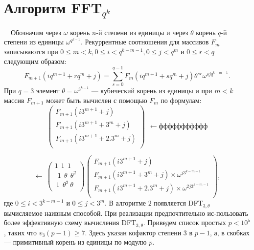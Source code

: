 \documentclass{mai_book}
\begin{document}
\section{Алгоритм  F{\footnotesize FT}$_{q^k}$}
\indent~~Обозначим через $\omega$ корень $n$-й степени из единицы и через $\theta$ корень\linebreak
$q$-й степени из единицы $\omega^{q^{k-1}}$. Рекуррентные соотношения для массивов\linebreak
$F_m$ записываются при $0\leq m<k,0\leq i< q^{k-m-1},0\leq j<q^m$ и $0\leq r<q$ \linebreak
следующим образом:
$$ 
F_{m+1}(iq^{m+1}+rq^m+j)=\sum^{q-1}_{s=0}F_m(iq^{m+1}+sq^m+j)\theta^{sr}\omega^{sjq^{k-m-1}}.
$$
\noindent При $q=3$ элемент $\theta=\omega^{3^{k-1}}$ --- кубический корень из единицы и при\linebreak
$m<k$ массив $F_{m+1}$ может быть вычислен с помощью $F_m$ по формулам:\linebreak
$$
\left(\begin{array}{c}
  F_{m+1}(i3^{m+1}+j)\\
  F_{m+1}(i3^{m+1}+3^m+j)\\
  F_{m+1}(i3^{m+1}+2.3^m+j)\\
\end{array}\right)~~\longleftarrow ффффффффффф
$$

$$
\longleftarrow~\left(\begin{array}{ccc}
  1 ~~1 ~~1\\
 ~~ 1 ~~\theta~~ \theta^2\\
 ~ 1~~ \theta^2 ~\theta\\
\end{array}\right)
\left(\begin{array}{c}
  F_{m+1}(i3^{m+1}+j)\\
  F_{m+1}(i3^{m+1}+3^m+j)\times\omega^{j3^{k-m-1}}\\
  F_{m+1}(i3^{m+1}+2.3^m+j)\times\omega^{2j3^{k-m-1}}\\
\end{array}\right),
$$
\noindent где $0\leq i<3^{k-m-1}$ и $0\leq j<3^m$. В алгоритме $2$ появляется  D{\footnotesize FT}$_{3,\theta}$\linebreak
вычисляемое наивным способой. При реализации предпочтительно ис-\linebreak пользовать более эффективную схему вычисления  D{\footnotesize FT}$_{3,\theta}$.
\newpage
\indent Приведем список простых $p<10^5$, таких что $v_3(p-1)\geq 7$. Здесь\linebreak
указан кофактор степени 3 в $p-1$, а, в скобках --- примитивный корень\linebreak
из единицы по модулю $p$.\\
\end{document}
